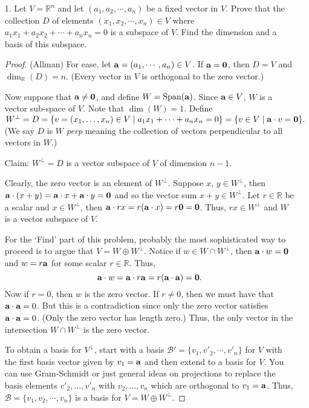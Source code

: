 \documentclass[10pt]{article}
\newcommand{\R}{\mathbb{R}}
\newcommand{\Span}{\operatorname{Span}}
\begin{document}
\begin{itemize}

\item[1.]  Let $V=\R^{n}$ and let $(a_{1},a_{2},\cdots,a_{n})$
be a fixed vector in $V$. Prove that the collection $D$ of elements
$(x_{1},x_{2},\cdots,x_{n})\in V$ where $a_{1}x_{1}+a_{2}x_{2}+\cdots+a_{n}x_{n}=0$
is a subspace of $V$. Find the dimension and a basis of this subspace.

\begin{proof} (Allman)
For ease, let ${\bf a} = (a_1, \cdots, a_n) \in V$.  If ${\bf a} = {\bf 0}$,
then $D = V$ and $\dim_\R(D) = n$.  (Every vector in $V$ is orthogonal to
the zero vector.)

Now suppose that ${\bf a} \neq {\bf 0}$, and define $W = \Span({\bf a})$.
Since ${\bf a} \in V$, $W$ is a vector sub-space of $V$.  Note that $\dim(W) = 1$.  Define $W^\perp = D = \{v = (x_1, \dots, x_n) \in V \mid a_1 x_1 + \cdots 
+ a_n x_n = 0 \} = \{ v \in V \mid {\bf a} \cdot v = {\bf 0}\}.$
(We say $D$ is \emph{$W$ perp} meaning the collection of vectors perpendicular
to all vectors in $W$.)

{\sc Claim:}  $W^\perp = D$ is a vector subspace of $V$ of dimension $n-1$.

\smallskip

Clearly, the zero vector is an element of $W^\perp$.  Suppose $x$, $y \in
W^\perp$, then ${\bf a} \cdot (x + y) = {\bf a} \cdot x + {\bf a} \cdot y
= {\bf 0}$ and so the vector sum $x + y \in W^\perp$.  Let $r \in \R$ be
a scalar and $x \in W^\perp$, then ${\bf a} \cdot rx = r({\bf a} \cdot x)
= r {\bf 0} = {\bf 0}$.  Thus, $rx \in W^\perp$ and $W$ is a vector subspace
of $V$.

For the `Find' part of this problem, probably the most sophisticated way to proceed is
to argue that $V = W \oplus W^\perp$.  Notice if $w \in W \cap W^\perp$,
then ${\bf a} \cdot w = {\bf 0}$ and $w = r {\bf a}$ for some scalar
$r \in \R$.  Thus,
$$
{\bf a} \cdot w = {\bf a} \cdot r {\bf a}
= r ({\bf a} \cdot {\bf a})
= {\bf 0}.
$$
Now if $r = 0$, then $w$ is the zero vector.  If $r \neq 0$, then we must
have that ${\bf a} \cdot {\bf a} = 0$.  But this is a contradiction since only
the zero vector satisfies ${\bf a} \cdot {\bf a} = 0$. (Only the zero vector
has length zero.)  Thus, the only vector in the intersection $W \cap W^\perp$
is the zero vector.

To obtain a basis for $V^\perp$, start with a basis $\mathcal{B'} = \{v_1,
v'_2, \cdots, v'_n\}$ for
$V$ with the first basis vector given by $v_1 = {\bf a}$ and then extend
to a basis for $V$.
You can use Gram-Schmidt or just general ideas on projections to replace
the basis elements $v'_2, \dots, v'_n$ with $v_2, \dots, v_n$ which are
orthogonal to $v_1 = {\bf a}$.  Thus, $\mathcal{B} = \{v_1, v_2, \cdots,
v_n\}$ is a basis for $V = W \oplus W^\perp$.


\end{proof}
\end{itemize}
\end{document}
